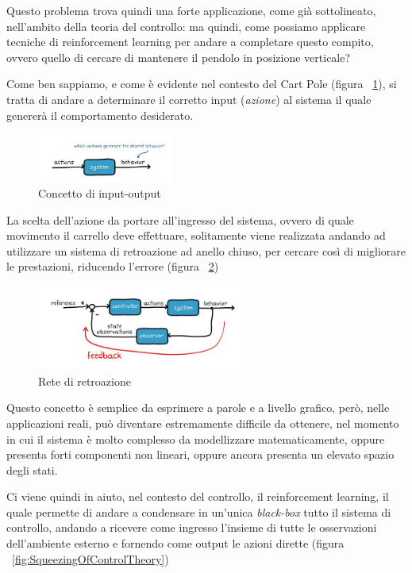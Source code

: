 Questo problema trova quindi una forte applicazione, come già sottolineato, nell'ambito della teoria del controllo: ma quindi, come possiamo applicare tecniche di reinforcement learning per andare a completare questo compito, ovvero quello di cercare di mantenere il pendolo in posizione verticale?

Come ben sappiamo, e come è evidente nel contesto del Cart Pole (figura ~\ref{fig:ActionBehaviour}), si tratta di andare a determinare il corretto input (\textit{azione}) al sistema il quale genererà il comportamento desiderato.

\begin{figure}[!h]
	\centering
	\includegraphics[width=0.4\textwidth]{Immagini/In_Out.JPG}
	\caption{Concetto di input-output}
	\label{fig:ActionBehaviour}
\end{figure}

La scelta dell'azione da portare all'ingresso del sistema, ovvero di quale movimento il carrello deve effettuare, solitamente viene realizzata andando ad utilizzare un sistema di retroazione ad anello chiuso, per cercare così di migliorare le prestazioni, riducendo l'errore (figura ~\ref{fig:ControlTheory})

\begin{figure}[!h]
	\centering
	\includegraphics[width=0.6\textwidth]{Immagini/ControlTheory.JPG}
	\caption{Rete di retroazione}
	\label{fig:ControlTheory}
\end{figure}
Questo concetto è semplice da esprimere a parole e a livello grafico, però, nelle applicazioni reali, può diventare estremamente difficile da ottenere, nel momento in cui il sistema è molto complesso da modellizzare matematicamente, oppure presenta forti componenti non lineari, oppure ancora presenta un elevato spazio degli stati.

Ci viene quindi in aiuto, nel contesto del controllo, il reinforcement learning, il quale permette di andare a condensare in un'unica \textit{black-box} tutto il sistema di controllo, andando a ricevere come ingresso l'insieme di tutte le osservazioni dell'ambiente esterno e fornendo come output le azioni dirette (figura ~\ref{fig:SqueezingOfControlTheory})

